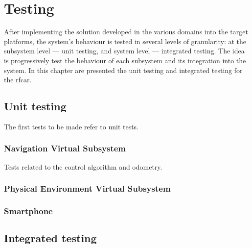 \chapter{Testing}%
\label{ch:testing}
After implementing the solution developed in the various domains into the
target platforms, the system's behaviour is tested in several levels of
granularity: at the subsystem level --- unit testing, and system level ---
integrated testing. The idea is progressively test the behaviour of each
subsystem and its integration into the system.
In this chapter are presented the unit testing and integrated testing for the \gls{rfcar}.
%
\section{Unit testing}%
\label{sec:unit-testing}
The first tests to be made refer to unit tests.
    \subsection{Navigation Virtual Subsystem}%
    \label{sec:navig-virt-subsyst-implem}
Tests related to the control algorithm and odometry.

    
    \subsection{Physical Environment Virtual Subsystem}%
    \label{sec:phys-envir-virt-design}
    
    \subsection{Smartphone}%
    \label{sec:smartphone-testing}
    
\section{Integrated testing}%
\label{sec:integrated-testing}

%
%

